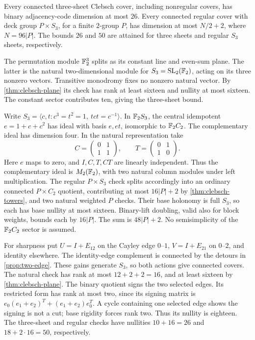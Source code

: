 \begin{corollary}
\label{cor:clebsch-s3}
\notformalized
Every connected three-sheet Clebsch cover, including nonregular
covers, has binary adjacency-code dimension at most $26$.
Every connected regular cover with deck group $P\times S_3$, for
a finite $2$-group $P$, has dimension at most $N/2+2$, where
$N=96|P|$. The bounds $26$ and $50$ are attained for three sheets
and regular $S_3$ sheets, respectively.
\end{corollary}
\begin{informalproof}
The permutation module $\mathbb{F}_2^3$ splits as its constant line and
even-sum plane. The latter is the natural two-dimensional module
for $S_3=\mathrm{SL}_2(\mathbb{F}_2)$, acting on its three nonzero vectors.
Transitive monodromy fixes no nonzero natural vector. By
\cref{thm:clebsch-plane} its check has rank at least sixteen and
nullity at most sixteen. The constant sector contributes ten,
giving the three-sheet bound.

Write $S_3=\langle c,t:c^3=t^2=1,\ tct=c^{-1}\rangle$.
In $\mathbb{F}_2S_3$, the central idempotent $e=1+c+c^2$ has ideal with
basis $e,et$, isomorphic to $\mathbb{F}_2C_2$. The complementary ideal has
dimension four. In the natural representation take
\[
 C=\begin{pmatrix}0&1\\1&1\end{pmatrix},\qquad
 T=\begin{pmatrix}0&1\\1&0\end{pmatrix}.
\]
Here $e$ maps to zero, and $I,C,T,CT$ are linearly independent.
Thus the complementary ideal is $M_2(\mathbb{F}_2)$, with two natural
column modules under left multiplication. The regular $P\times S_3$
check splits accordingly into an ordinary connected $P\times C_2$
quotient, contributing at most $16|P|+2$ by
\cref{thm:clebsch-towers}, and two natural weighted $P$ checks.
Their base holonomy is full $S_3$, so each has base nullity at most
sixteen. Binary-lift doubling, valid also for block weights, bounds
each by $16|P|$. The sum is $48|P|+2$. No semisimplicity of the
$\mathbb{F}_2C_2$ sector is assumed.

For sharpness put $U=I+E_{12}$ on the Cayley edge $0$--$1$,
$V=I+E_{21}$ on $0$--$2$, and identity elsewhere. The identity-edge
complement is connected by the detours in \cref{prop:two-edge}.
These gains generate $S_3$, so both actions give connected covers.
The natural check has rank at most $12+2+2=16$, and at least sixteen
by \cref{thm:clebsch-plane}. The binary quotient signs the two
selected edges. Its restricted form has rank at most two, since
its signing matrix is
$e_0(e_1+e_2)^T+(e_1+e_2)e_0^T$. A cycle containing one selected
edge shows the signing is not a cut; base rigidity forces rank two.
Thus its nullity is eighteen. The three-sheet and regular checks
have nullities $10+16=26$ and $18+2\cdot16=50$, respectively.
\end{informalproof}

